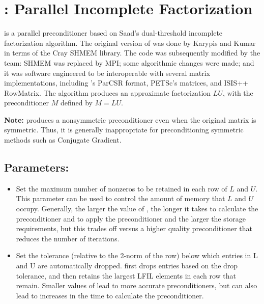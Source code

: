 
\section{\pilut: Parallel Incomplete Factorization}
\label{PILUT}

\pilut{} is a parallel preconditioner based on Saad's dual-threshold incomplete
factorization algorithm. The original version of \pilut{} was done by Karypis
and Kumar \cite{GKarypis_VKumar_1998} in terms of the Cray SHMEM library. The
code was subsequently modified by the \hypre{} team: SHMEM was replaced by MPI;
some algorithmic changes were made; and it was software engineered to be
interoperable with several matrix implementations, including \hypre{}'s ParCSR
format, PETSc's matrices, and ISIS++ RowMatrix. The algorithm produces an
approximate factorization $ L U$, with the preconditioner $M$ defined by $ M =
L U $.

{\bf Note:} \pilut{} produces a nonsymmetric preconditioner even when the
original matrix is symmetric. Thus, it is generally inappropriate for
preconditioning symmetric methods such as Conjugate Gradient.


\subsection*{Parameters:}

\begin{itemize}

\item
{}
Set the maximum number of nonzeros to be retained in each row of $L$ and $U$.
This parameter can be used to control the amount of memory that $L$ and $U$
occupy. Generally, the larger the value of , the longer it takes to
calculate the preconditioner and to apply the preconditioner and the larger
the storage requirements, but this trades
off versus a higher quality preconditioner that reduces the number of
iterations.

\item
{}
Set the tolerance (relative to the 2-norm of the row) below which entries in L
and U are automatically dropped. \pilut{} first drops entries based on the drop
tolerance, and then retains the largest LFIL elements in each row that remain.
Smaller values of  lead to more accurate preconditioners, but can
also lead to increases in the time to calculate the preconditioner.

\end{itemize}
